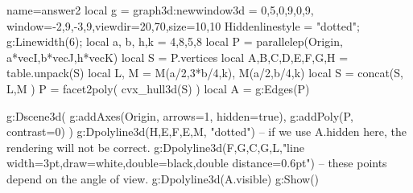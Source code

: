 \documentclass{standalone}
\begin{document}
\begin{luadraw}{name=answer2}
local g = graph3d:new{window3d = {0,5,0,9,0,9}, window={-2,9,-3,9},viewdir={20,70},size={10,10}}
Hiddenlinestyle = "dotted"; g:Linewidth(6);
local a, b, h,k = 4,8,5,8
local P = parallelep(Origin, a*vecI,b*vecJ,h*vecK)
local S = P.vertices
local A,B,C,D,E,F,G,H = table.unpack(S)
local L, M = M(a/2,3*b/4,k), M(a/2,b/4,k)
local S = concat(S, {L,M} )
P = facet2poly( cvx_hull3d(S) )
local A = g:Edges(P)

g:Dscene3d( g:addAxes(Origin, {arrows=1, hidden=true}), g:addPoly(P, {contrast=0}) )
g:Dpolyline3d({{H,E,F},{E,M}}, "dotted") -- if we use A.hidden here, the rendering will not be correct.
g:Dpolyline3d({{F,G},{C,G,L}},"line width=3pt,draw=white,double=black,double distance=0.6pt") -- these points depend on the angle of view.
g:Dpolyline3d(A.visible)
g:Show()
\end{luadraw}
\end{document}
